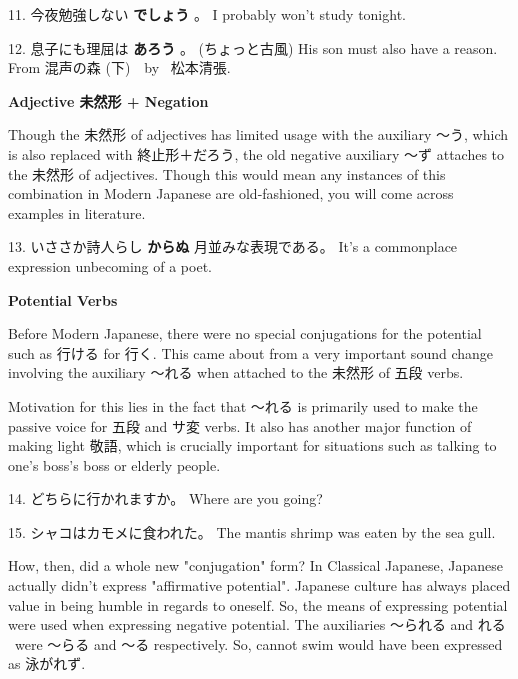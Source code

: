 \par{11. 今夜勉強しない \textbf{でしょう }。 \hfill\break
I probably won't study tonight. }

\par{12. 息子にも理屈は \textbf{あろう }。 (ちょっと古風) \hfill\break
His son must also have a reason. \hfill\break
From 混声の森 (下)　by  松本清張. }

\begin{center}
 \textbf{Adjective 未然形 + Negation }
\end{center}

\par{ Though the 未然形 of adjectives has limited usage with the auxiliary ～う, which is also replaced with 終止形＋だろう, the old negative auxiliary ～ず attaches to the 未然形 of adjectives. Though this would mean any instances of this combination in Modern Japanese are old-fashioned, you will come across examples in literature. }

\par{13. いささか詩人らし \textbf{からぬ }月並みな表現である。 \hfill\break
It's a commonplace expression unbecoming of a poet. }

\begin{center}
 \textbf{Potential Verbs }
\end{center}

\par{ Before Modern Japanese, there were no special conjugations for the potential such as 行ける for 行く. This came about from a very important sound change involving the auxiliary ～れる when attached to the 未然形 of 五段 verbs. }

\par{ Motivation for this lies in the fact that ～れる is primarily used to make the passive voice for 五段 and サ変 verbs. It also has another major function of making light 敬語, which is crucially important for situations such as talking to one's boss's boss or elderly people. }

\par{14. どちらに行かれますか。 \hfill\break
Where are you going? }

\par{15. シャコはカモメに食われた。 \hfill\break
The mantis shrimp was eaten by the sea gull. }

\par{ How, then, did a whole new "conjugation" form? In Classical Japanese, Japanese actually didn't express "affirmative potential". Japanese culture has always placed value in being humble in regards to oneself. So, the means of expressing potential were used when expressing negative potential. The auxiliaries ～られる and れる  were ～らる and ～る respectively. So, cannot swim would have been expressed as 泳がれず. }

